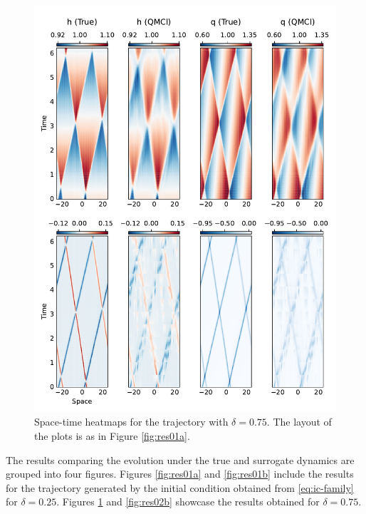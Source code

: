 \documentclass[letterpaper,10pt,3p,preprint]{elsarticle}
\begin{document}
\begin{figure}[t!]
    \centering
    \includegraphics[width=.7\textwidth]{res02a.pdf}
    \caption{Space-time heatmaps for the trajectory with $\delta=0.75$.
    The layout of the plots is as in Figure \ref{fig:res01a}.}
    \label{fig:res02a}
\end{figure}

The results comparing the evolution under the true and surrogate
dynamics are grouped into four figures.
Figures \ref{fig:res01a} and \ref{fig:res01b}
include the results for the trajectory generated by the initial
condition obtained from
\eqref{eq:ic-family} for $\delta=0.25$.
Figures \ref{fig:res02a} and \ref{fig:res02b}
showcase the results obtained for $\delta=0.75$.
\end{document}
